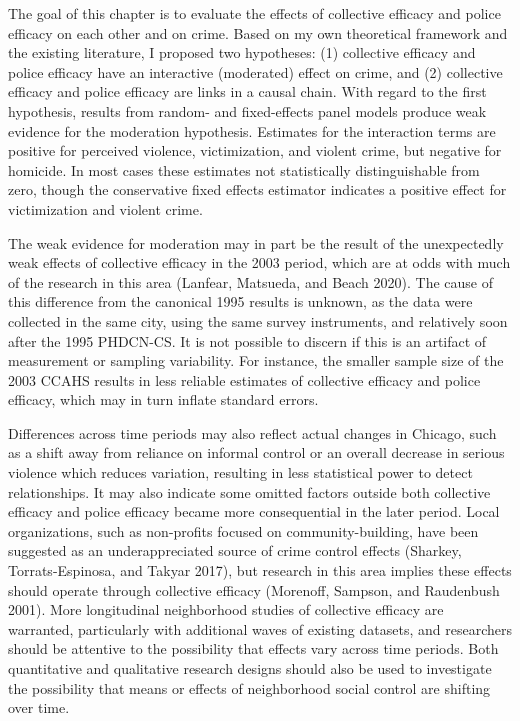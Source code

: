 \documentclass [11pt, proquest] {uwthesis}[2015/03/03]
\begin{document}
The goal of this chapter is to evaluate the effects of collective efficacy and police efficacy on each other and on crime. Based on my own theoretical framework and the existing literature, I proposed two hypotheses: (1) collective efficacy and police efficacy have an interactive (moderated) effect on crime, and (2) collective efficacy and police efficacy are links in a causal chain. With regard to the first hypothesis, results from random- and fixed-effects panel models produce weak evidence for the moderation hypothesis. Estimates for the interaction terms are positive for perceived violence, victimization, and violent crime, but negative for homicide. In most cases these estimates not statistically distinguishable from zero, though the conservative fixed effects estimator indicates a positive effect for victimization and violent crime.

The weak evidence for moderation may in part be the result of the unexpectedly weak effects of collective efficacy in the 2003 period, which are at odds with much of the research in this area (Lanfear, Matsueda, and Beach 2020). The cause of this difference from the canonical 1995 results is unknown, as the data were collected in the same city, using the same survey instruments, and relatively soon after the 1995 PHDCN-CS. It is not possible to discern if this is an artifact of measurement or sampling variability. For instance, the smaller sample size of the 2003 CCAHS results in less reliable estimates of collective efficacy and police efficacy, which may in turn inflate standard errors.

Differences across time periods may also reflect actual changes in Chicago, such as a shift away from reliance on informal control or an overall decrease in serious violence which reduces variation, resulting in less statistical power to detect relationships. It may also indicate some omitted factors outside both collective efficacy and police efficacy became more consequential in the later period. Local organizations, such as non-profits focused on community-building, have been suggested as an underappreciated source of crime control effects (Sharkey, Torrats-Espinosa, and Takyar 2017), but research in this area implies these effects should operate through collective efficacy (Morenoff, Sampson, and Raudenbush 2001). More longitudinal neighborhood studies of collective efficacy are warranted, particularly with additional waves of existing datasets, and researchers should be attentive to the possibility that effects vary across time periods. Both quantitative and qualitative research designs should also be used to investigate the possibility that means or effects of neighborhood social control are shifting over time.
\end{document}
